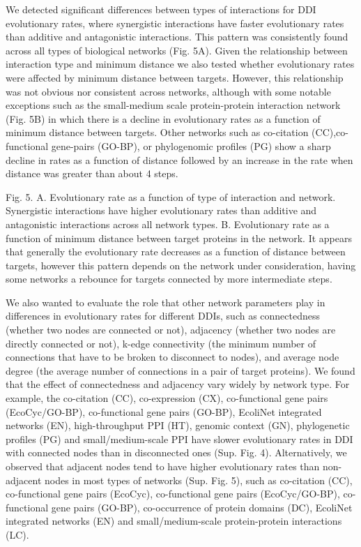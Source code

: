 \documentclass[]{elsarticle} %
\begin{document}
We detected significant differences between types of interactions for DDI evolutionary rates, where synergistic interactions have faster evolutionary rates than additive and antagonistic interactions. This pattern was consistently found across all types of biological networks (Fig. 5A). Given the relationship between interaction type and minimum distance we also tested whether evolutionary rates were affected by minimum distance between targets. However, this relationship was not obvious nor consistent across networks, although with some notable exceptions such as the small-medium scale protein-protein interaction network (Fig. 5B) in which there is a decline in evolutionary rates as a function of minimum distance between targets. Other networks such as co-citation (CC),co-functional gene-pairs (GO-BP), or phylogenomic profiles (PG) show a sharp decline in rates as a function of distance followed by an increase in the rate when distance was greater than about 4 steps.

Fig. 5. A. Evolutionary rate as a function of type of interaction and network. Synergistic interactions have higher evolutionary rates than additive and antagonistic interactions across all network types. B. Evolutionary rate as a function of minimum distance between target proteins in the network. It appears that generally the evolutionary rate decreases as a function of distance between targets, however this pattern depends on the network under consideration, having some networks a rebounce for targets connected by more intermediate steps.

We also wanted to evaluate the role that other network parameters play in differences in evolutionary rates for different DDIs, such as connectedness (whether two nodes are connected or not), adjacency (whether two nodes are directly connected or not), k-edge connectivity (the minimum number of connections that have to be broken to disconnect to nodes), and average node degree (the average number of connections in a pair of target proteins). We found that the effect of connectedness and adjacency vary widely by network type. For example, the co-citation (CC), co-expression (CX), co-functional gene pairs (EcoCyc/GO-BP), co-functional gene pairs (GO-BP), EcoliNet integrated networks (EN), high-throughput PPI (HT), genomic context (GN), phylogenetic profiles (PG) and small/medium-scale PPI have slower evolutionary rates in DDI with connected nodes than in disconnected ones (Sup. Fig. 4). Alternatively, we observed that adjacent nodes tend to have higher evolutionary rates than non-adjacent nodes in most types of networks (Sup. Fig. 5), such as co-citation (CC), co-functional gene pairs (EcoCyc), co-functional gene pairs (EcoCyc/GO-BP), co-functional gene pairs (GO-BP), co-occurrence of protein domains (DC), EcoliNet integrated networks (EN) and small/medium-scale protein-protein interactions (LC).
\end{document}
